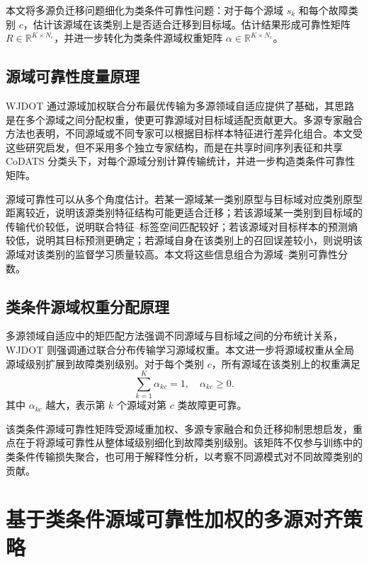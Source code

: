 \documentclass{seuthesis-2022}
\begin{document}
本文将多源负迁移问题细化为类条件可靠性问题：对于每个源域 $s_k$ 和每个故障类别 $c$，估计该源域在该类别上是否适合迁移到目标域。估计结果形成可靠性矩阵 $R\in\mathbb{R}^{K\times N_c}$，并进一步转化为类条件源域权重矩阵 $\alpha\in\mathbb{R}^{K\times N_c}$。

\subsection{源域可靠性度量原理}

WJDOT 通过源域加权联合分布最优传输为多源领域自适应提供了基础，其思路是在多个源域之间分配权重，使更可靠源域对目标域适配贡献更大\cite{turrisi2022wjdot}。多源专家融合方法也表明，不同源域或不同专家可以根据目标样本特征进行差异化组合\cite{guo2018moe}。本文受这些研究启发，但不采用多个独立专家结构，而是在共享时间序列表征和共享 CoDATS 分类头下，对每个源域分别计算传输统计，并进一步构造类条件可靠性矩阵。

源域可靠性可以从多个角度估计。若某一源域某一类别原型与目标域对应类别原型距离较近，说明该源类别特征结构可能更适合迁移；若该源域某一类别到目标域的传输代价较低，说明联合特征--标签空间匹配较好；若该源域对目标样本的预测熵较低，说明其目标预测更确定；若源域自身在该类别上的召回误差较小，则说明该源域对该类别的监督学习质量较高。本文将这些信息组合为源域--类别可靠性分数。

\subsection{类条件源域权重分配原理}

多源领域自适应中的矩匹配方法强调不同源域与目标域之间的分布统计关系\cite{peng2019m3sda}，WJDOT 则强调通过联合分布传输学习源域权重\cite{turrisi2022wjdot}。本文进一步将源域权重从全局源域级别扩展到故障类别级别。对于每个类别 $c$，所有源域在该类别上的权重满足
\begin{equation}
    \sum_{k=1}^{K}\alpha_{kc}=1,\quad
    \alpha_{kc}\geq 0.
\end{equation}
其中 $\alpha_{kc}$ 越大，表示第 $k$ 个源域对第 $c$ 类故障更可靠。

该类条件源域可靠性矩阵受源域重加权、多源专家融合和负迁移抑制思想启发，重点在于将源域可靠性从整体域级别细化到故障类别级别。该矩阵不仅参与训练中的类条件传输损失聚合，也可用于解释性分析，以考察不同源模式对不同故障类别的贡献。

\section{基于类条件源域可靠性加权的多源对齐策略}
\end{document}

